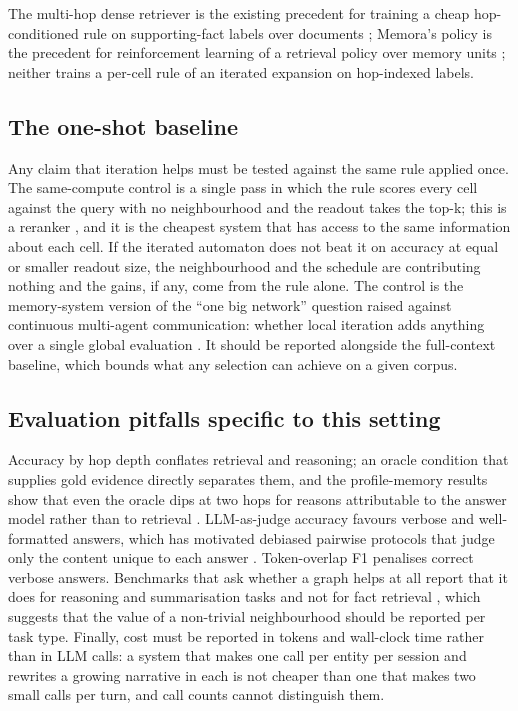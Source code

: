 \documentclass[11pt]{article}
\begin{document}
The multi-hop dense retriever is the existing precedent for training a cheap hop-conditioned rule on supporting-fact labels over documents \cite{mdr}; Memora's policy is the precedent for reinforcement learning of a retrieval policy over memory units \cite{memora}; neither trains a per-cell rule of an iterated expansion on hop-indexed labels.

\subsection{The one-shot baseline}

Any claim that iteration helps must be tested against the same rule applied once. The same-compute control is a single pass in which the rule scores every cell against the query with no neighbourhood and the readout takes the top-k; this is a reranker \cite{monobert}, and it is the cheapest system that has access to the same information about each cell. If the iterated automaton does not beat it on accuracy at equal or smaller readout size, the neighbourhood and the schedule are contributing nothing and the gains, if any, come from the rule alone. The control is the memory-system version of the ``one big network'' question raised against continuous multi-agent communication: whether local iteration adds anything over a single global evaluation \cite{discretemsg}. It should be reported alongside the full-context baseline, which bounds what any selection can achieve on a given corpus.

\subsection{Evaluation pitfalls specific to this setting}

Accuracy by hop depth conflates retrieval and reasoning; an oracle condition that supplies gold evidence directly separates them, and the profile-memory results show that even the oracle dips at two hops for reasons attributable to the answer model rather than to retrieval \cite{prograph}. LLM-as-judge accuracy favours verbose and well-formatted answers, which has motivated debiased pairwise protocols that judge only the content unique to each answer \cite{benchmarkqed,unbiasedgraphrag}. Token-overlap F1 penalises correct verbose answers. Benchmarks that ask whether a graph helps at all report that it does for reasoning and summarisation tasks and not for fact retrieval \cite{graphragbench}, which suggests that the value of a non-trivial neighbourhood should be reported per task type. Finally, cost must be reported in tokens and wall-clock time rather than in LLM calls: a system that makes one call per entity per session and rewrites a growing narrative in each is not cheaper than one that makes two small calls per turn, and call counts cannot distinguish them.
\end{document}
